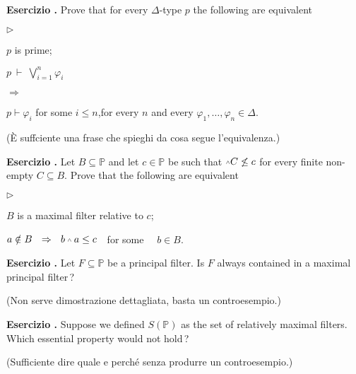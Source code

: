 \documentclass[10pt]{article}
\def\phi{\varphi}
\def\PP{\mathds P}
\def\IMP{\Rightarrow}
\def\swedge{\mathbin{\raisebox{.2ex}{\tiny$\mathbin\wedge$}}}
\newcommand{\labella}[1]{{\sf\footnotesize #1}\hfill}
\renewenvironment{itemize}
  {\begin{list}{$\triangleright$}{%
   \setlength{\parskip}{0mm}
   \setlength{\topsep}{0mm}
   \setlength{\rightmargin}{0mm}
   \setlength{\listparindent}{0mm}
   \setlength{\itemindent}{0mm}
   \setlength{\labelwidth}{3ex}
   \setlength{\itemsep}{0mm}
   \setlength{\parsep}{0mm}
   \setlength{\partopsep}{0mm}
   \setlength{\labelsep}{1ex}
   \setlength{\leftmargin}{\labelwidth+\labelsep}
   \let\makelabel\labella}}{%
   \end{list}}
\newcounter{ex}
\newenvironment{exercise}{\clearpage\addtocounter{ex}{1}\textbf{Esercizio \theex.\quad}}{}
\begin{document}
\clearpage%
\rhead{}\setcounter{ex}{0}


\begin{exercise}
Prove that for every $\Delta$-type $p$ the following are equivalent
\begin{itemize}
\item[1.] $p$ is prime;
\item[2.] $\displaystyle p\ \vdash\ \bigvee^n_{i=1}\phi_i$\parbox{6ex}{\hfil$\IMP$}$p\vdash\phi_i$ for some $i\le n$,\hfill for every $n$ and every $\phi_1,\dots,\phi_n\in\Delta$.
\end{itemize}

(È suffciente una frase che spieghi da cosa segue l'equivalenza.)
\end{exercise}



\begin{exercise}
Let $B\subseteq \PP$ and let $c\in \PP$ be such that $\swedge C\not\le c$ for every finite non-empty $C\subseteq B$. Prove that the following are equivalent
\begin{itemize}
\item[1.] $B$ is a maximal filter relative to $c$;
\item[2.] $a\notin B\ \ \IMP\ \ b\swedge a \le c$\ \  for some \ \ $b\in B$.
\end{itemize}
\end{exercise}


\begin{exercise}
Let $F\subseteq\PP$ be a principal filter. Is $F$ always contained in a maximal principal filter\,?

(Non serve dimostrazione dettagliata, basta un controesempio.)
\end{exercise}


\begin{exercise}
Suppose we defined $S(\PP)$ as the set of relatively maximal filters. Which essential property would not hold\,?

(Sufficiente dire quale e perché senza produrre un controesempio.)
\end{exercise}
\end{document}
